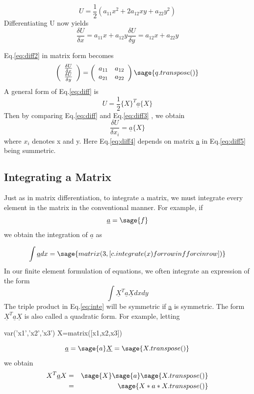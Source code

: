\documentclass[12pt]{report}
\newcommand{\lab}[1]{
Eq.\ref{#1}
}
\begin{document}
\begin{equation} U = \frac{1}{2}(a_{{11}}x^2 +2a_{{12}}xy + a_{{22}}y^2)\end{equation}
Differentiating U now yields 
\begin{equation} \frac{\delta U}{\delta x} = a_{{11}}x + a_{{12}}y  \frac{\delta U}{\delta y} = a_{{12}}x + a_{{22}}y \label{eq:diff2}\end{equation} 
\lab{eq:diff2} in matrix form becomes
\begin{equation}\left(\begin{array}{rr} \frac{\delta U}{\delta x} \\ \frac{\delta U}{\delta y} \\ \end{array}\right) = \left(\begin{array}{rr}a_{11} & a_{12} \\a_{21} & a_{22}\\ \end{array}\right) \sage{q.transpose()}\label{eq:diff3}\end{equation}
A general form of \lab{eq:diff} is 
\begin{equation} U = \frac{1}{2}\{X\}^T\underline{a}\{X\}\label{eq:diff5}\end{equation}
Then by comparing \lab{eq:diff} and \lab{eq:diff3}, we obtain 
\begin{equation}\frac{ \delta U}{\delta x_{i}} = \underline{a}\{X\}\label{eq:diff4}\end{equation}
where $x_{i}$ denotes x and y. Here \lab{eq:diff4} depends on matrix \underline{a} in \lab{eq:diff5}being summetric.

\subsection{Integrating a Matrix}
Just as in matrix differentiation, to integrate a matrix, we must
integrate every element in the matrix in the conventional manner. For
example, if
$$ \underline{a} = \sage{f}$$
we obtain the integration of $\underline{a}$ as

$$\int \underline{a}dx = \sage{matrix(3,[c.integrate(x) for row in f for c in row ])
}$$
In our finite element formulation of equations, we often integrate an
expression of the form
\begin{equation}\int \underline{X}^T\underline{a}\underline{X} dx dy \label{eq:inte}\end{equation}
The triple product in \lab{eq:inte} will be symmetric if \underline{a} is
symmetric. The form $\underline{X}^T\underline{a}\underline{X}$ is also called a quadratic form. For
example, letting
\begin{sagesilent}
var('x1','x2','x3')
X=matrix([x1,x2,x3])
\end{sagesilent}
$$\underline{a} = \sage{a} \underline{X}= \sage{X.transpose()}$$
we obtain
\begin{eqnarray} {X}^T\underline{a}{X} &=& \sage{X}\sage{a}\sage{X.transpose()} \nonumber\\ &=&\sage{X*a*X.transpose()} \end{eqnarray}
\end{document}
